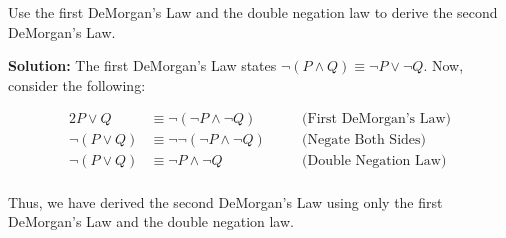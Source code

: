 Use the first DeMorgan's Law and the double negation law to derive the second DeMorgan's Law.

\textbf{Solution:} The first DeMorgan's Law states $\neg (P \wedge Q) \equiv \neg P \vee \neg Q$. Now, consider the following:

\begin{alignat*}{2}
    P \vee Q & \equiv \neg (\neg P  \wedge \neg Q) \quad && \text{(First DeMorgan's Law)} \\
    \neg (P \vee Q) & \equiv \neg \neg (\neg P  \wedge \neg Q) \quad && \text{(Negate Both Sides)} \\
    \neg (P \vee Q) & \equiv \neg P  \wedge \neg Q \quad && \text{(Double Negation Law)}\\
\end{alignat*}

Thus, we have derived the second DeMorgan's Law using only the first DeMorgan's Law and the double negation law.

\pagebreak
